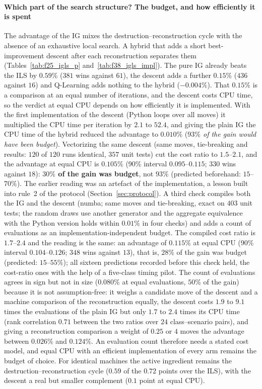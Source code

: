 \paragraph{Which part of the search structure? The budget, and how efficiently it is spent}
The advantage of the IG mixes the destruction--reconstruction cycle with the absence of an exhaustive local search. A hybrid that adds a short best-improvement descent after each reconstruction separates
them (Tables~\ref{tab:f25_igls_p} and~\ref{tab:f38_igls_impl}). The pure IG already beats the ILS by $0.59\%$ ($381$ wins against $61$), the descent adds a further $0.15\%$ ($436$ against $16$) and Q-Learning adds
nothing to the hybrid ($-0.004\%$). That $0.15\%$ is a comparison at an equal number of iterations, and the descent costs CPU time, so the verdict at equal CPU depends on how efficiently it is implemented. With the first implementation
of the descent (Python loops over all moves) it multiplied the CPU time per iteration by $2.1$ to $52.4$, and giving the plain IG the CPU time of the hybrid reduced the advantage to $0.010\%$ (\emph{$93\%$ of the gain would have been budget}).
Vectorizing the same descent (same moves, tie-breaking and results: $120$ of $120$ runs identical, $357$ unit tests) cut the cost ratio to $1.5$--$2.1$, and the advantage at equal CPU is $0.105\%$ (90\% interval $0.095$--$0.115$; $330$ wins
against $18$): \textbf{$30\%$ of the gain was budget}, not $93\%$ (predicted beforehand: $15$--$70\%$). The earlier reading was an artefact of the implementation, a lesson built into rule~2 of the protocol (Section~\ref{sec:protocol}). A third check compiles both the IG and the descent (numba; same moves and tie-breaking, exact on $403$ unit tests; the random draws use another generator and the aggregate
equivalence with the Python version holds within $0.01\%$ in four checks) and adds a count of evaluations as an implementation-independent budget. The compiled cost ratio is $1.7$--$2.4$ and the reading is the same: an advantage of $0.115\%$ at equal CPU
(90\% interval $0.104$--$0.126$; $348$ wins against $13$), that is, $28\%$ of the gain was budget (predicted: $15$--$55\%$); all sixteen predictions recorded before this check held, the cost-ratio ones with the help of a five-class timing pilot. The count of evaluations
agrees in sign but not in size ($0.080\%$ at equal evaluations, $50\%$ of the gain) because it is not assumption-free: it weighs a candidate move of the descent and a machine comparison of the reconstruction equally, the descent costs $1.9$ to $9.1$ times the
evaluations of the plain IG but only $1.7$ to $2.4$ times its CPU time (rank correlation $0.71$ between the two ratios over $24$ class--scenario pairs), and giving a reconstruction comparison a weight of $0.25$ or $4$ moves the advantage between
$0.026\%$ and $0.124\%$. An evaluation count therefore needs a stated cost model, and equal CPU with an efficient implementation of every arm remains the budget of choice. For identical machines the
active ingredient remains the destruction--reconstruction cycle ($0.59$ of the $0.72$ points over the ILS), with the descent a real but smaller complement ($0.1$ point at equal CPU).

